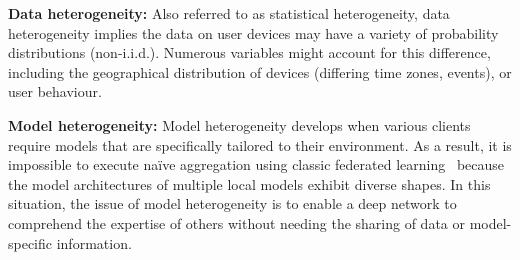 \documentclass[withindex,glossary,firstyr]{cam-thesis}
\begin{document}
\textbf{Data heterogeneity:} Also referred to as statistical heterogeneity, data heterogeneity implies the data on user devices may have a variety of probability distributions (non-i.i.d.). Numerous variables might account for this difference, including the geographical distribution of devices (differing time zones, events), or user behaviour. 

\textbf{Model heterogeneity:} Model heterogeneity develops when various clients require models that are specifically tailored to their environment.
As a result, it is impossible to execute naïve aggregation using classic federated learning~\cite{wu2020personalized} because the model architectures of multiple local models exhibit diverse shapes. In this situation, the issue of model heterogeneity is to enable a deep network to comprehend the expertise of others without needing the sharing of data or model-specific information.



\end{document}
